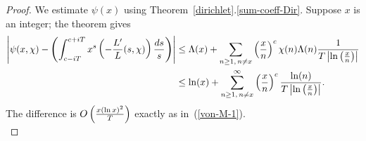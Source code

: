 \begin{proof}
 We estimate $\psi(x)$ using Theorem~\ref{dirichlet}.\ref{sum-coeff-Dir}. Suppose $x$ is an integer; the theorem gives
\begin{align*}
\left| {\psi(x,\chi)-\left( {
\int_{c-iT}^{c+iT} x^s\left( {-\frac{L'}{L}(s,\chi)} \right)\frac{ds}s
} \right)} \right|&\le
\Lambda(x)+
\sum_{n\ge 1,\,n\ne x} \left( {\frac{x}{n}} \right)^c\chi(n)\Lambda(n)\frac{1}{T\left| {\ln\left( {\frac{x}{n}} \right)} \right|}\\
&\le 
\ln(x)+\sum_{n\ge 1,\,n\ne x}^{\infty}\left( {\frac{x}{n}} \right)^c\frac{\ln(n)}{T\left| {\ln\left( {\frac{x}{n}} \right)} \right|}.
\end{align*}
The difference is $O\left( {\frac{x(\ln x)^2}{T}} \right)$ exactly as in~(\ref{von-M-1}).\\


\end{proof}
